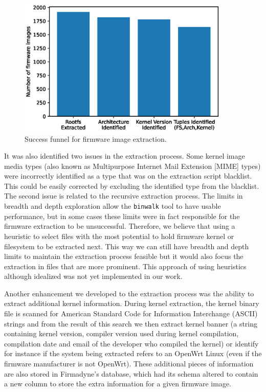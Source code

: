 \begin{figure}[H]
    \centering
    \includegraphics[width=0.90\textwidth]{figs/extraction_funnel.eps}
    \caption{Success funnel for firmware image extraction.}
    \label{fig:stats-funnel}
\end{figure}


It was also identified two issues in the extraction process. Some kernel image media types (also known as Multipurpose Internet Mail Extension [MIME] types) were incorrectly identified as a type that was on the extraction script blacklist. This could be easily corrected by excluding the identified type from the blacklist. The second issue is related to the recursive extraction process. The limits in breadth and depth exploration allow the {\tt binwalk} tool to have usable performance, but in some cases these limits were in fact responsible for the firmware extraction to be unsuccessful. Therefore, we believe that using a heuristic to select files with the most potential to hold firmware kernel or filesystem to be extracted next. This way we can still have breadth and depth limits to maintain the extraction process feasible but it would also focus the extraction in files that are more prominent. This approach of using heuristics although idealized was not yet implemented in our work.

Another enhancement we developed to the extraction process was the ability to extract additional kernel information. During kernel extraction, the kernel binary file is scanned for American Standard Code for Information Interchange (ASCII) strings and from the result of this search we then extract kernel banner (a string containing kernel version, compiler version used during kernel compilation, compilation date and email of the developer who compiled the kernel) or identify for instance if the system being extracted refers to an OpenWrt Linux (even if the firmware manufacturer is not OpenWrt). These additional pieces of information are also stored in Firmadyne's \cite{firmadyne} database, which had its schema altered to contain a new column to store the extra information for a given firmware image.

